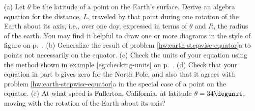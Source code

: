 (a) Let $\theta $ be the latitude of a point on the
Earth's surface.  Derive an algebra equation for the
distance, $L$, traveled by that point during one rotation of
the Earth about its axis, i.e., over one day, expressed in
terms of $\theta$ and $R$, the radius of the earth.
You may find it helpful to draw one or more diagrams in the style
of figure  on p.~\pageref{fig:tomato}.\answercheck\hwendpart
(b) Generalize the result of problem \ref{hw:earth-stepwise-equator}a to
points not necessarily on the equator.\answercheck\hwendpart
(c) Check the units of your equation using the method shown in example \ref{eg:checking-units}
on p.~\pageref{eg:checking-units}.\hwendpart
(d) Check that your equation in part b gives zero for the North Pole, and also that
it agrees with problem \ref{hw:earth-stepwise-equator}a in the special case of a point
on the equator.\hwendpart
(e) At what speed is Fullerton, California, at latitude 
$\theta=34\degunit$, moving with the rotation of the Earth about its
axis?\answercheck\hwendpart

